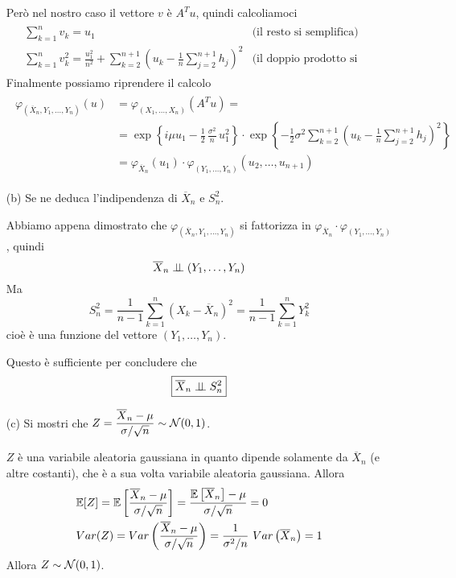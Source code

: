 \begin{enumerate}
$$$$
Però nel nostro caso il vettore $v$ è $A^T u$, quindi calcoliamoci
\begin{gather*}
\begin{aligned}
&\sum_{k=1}^n v_k=u_1 &\text{(il resto si semplifica)} \\
&\sum_{k=1}^n v_k^2=\frac{u_1^2}{n^2}+\sum_{k=2}^{n+1}\left(u_k-\frac{1}{n}\sum_{j=2}^{n+1}h_j \right)^2 &\text{(il doppio prodotto si semplifica)}
\end{aligned}
\end{gather*}
Finalmente possiamo riprendere il calcolo 
\begin{gather*}
\begin{aligned}
\varphi_{(\overline{X}_n,Y_1,\dots,Y_n)}(u)&=\varphi_{(X_1,\dots,X_n)}\left(A^T  u\right)= \\
&=\exp\left\{i\mu u_1-\frac{1}{2}\,\frac{\sigma^2}{n}\, u_1^2\right\}\cdot \exp\left\{-\frac{1}{2}\sigma^2 \sum_{k=2}^{n+1}\left(u_k-\frac{1}{n}\sum_{j=2}^{n+1}h_j \right)^2  \right\} \\
&=\varphi_{\overline{X}_n}(u_1)\cdot \varphi_{(Y_1,\dots,Y_n)}(u_2,\dots,u_{n+1})
\end{aligned}
\end{gather*}

\item [(b)] Se ne deduca l'indipendenza di $\overline{X}_n$ e $S_n^2$.

Abbiamo appena dimostrato che $\varphi_{(\overline{X}_n,Y_1,\dots,Y_n)}$ si fattorizza in $\varphi_{\overline{X}_n}\cdot \varphi_{(Y_1,\dots,Y_n)}$, quindi 
$$
\overline{X}_n\perp \!\!\! \perp(Y_1,\dots,Y_n)
$$
Ma 
$$
S_n^2=\frac{1}{n-1}\sum_{k=1}^n\left( X_k-\overline{X}_n  \right)^2 = \frac{1}{n-1}\sum_{k=1}^n Y_k^2
$$
cioè è una funzione del vettore  $(Y_1,\dots,Y_n)$. 

Questo è sufficiente per concludere che 
$$
\boxed{\overline{X}_n\perp \!\!\! \perp S_n^2}
$$

\item [(c)] Si mostri che $Z=\dfrac{\overline{X}_n-\mu}{\sigma/\sqrt{n}}\sim\mathcal{N}(0,1)$.

$Z$ è una variabile aleatoria gaussiana in quanto dipende solamente da $\overline{X}_n$ (e altre costanti), che è a sua volta variabile aleatoria gaussiana. Allora
\begin{gather*}
\begin{aligned}
&\mathbb{E}[Z]=\mathbb{E}\left[\frac{\overline{X}_n-\mu}{\sigma/\sqrt{n}} \right]=\frac{\mathbb{E}\left[\overline{X}_n\right]-\mu}{\sigma/\sqrt{n}}=0 \\
&Var(Z)=Var\left(\frac{\overline{X}_n-\mu}{\sigma/\sqrt{n}} \right)=\frac{1}{\sigma^2/n}\ Var\left(\overline{X}_n\right)=1
\end{aligned}
\end{gather*}
Allora $Z\sim\mathcal{N}(0,1)$.


\end{enumerate}

